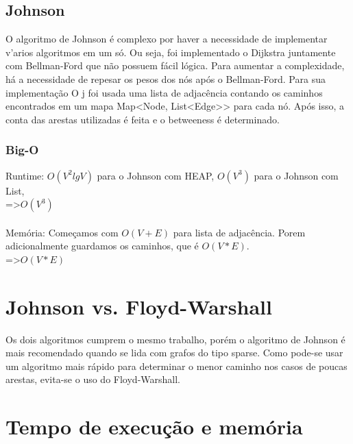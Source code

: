 \documentclass[a4paper,11pt,oneside]{article}
\begin{document}
    \subsection{Johnson}
    O algoritmo de Johnson \'e complexo por haver a necessidade de implementar v'arios algoritmos em um s\'o. Ou seja, foi implementado o Dijkstra juntamente com Bellman-Ford que n\~ao possuem f\'acil l\'ogica. Para aumentar a complexidade, h\'a a necessidade de repesar os pesos dos n\'os ap\'os o Bellman-Ford. Para sua implementa\c{c}\~ao O j foi usada uma lista de adjac\^encia contando os caminhos encontrados em um mapa Map{\textless}Node, List{\textless}Edge{\textgreater}{\textgreater} para cada n\'o. Ap\'os isso, a conta das arestas utilizadas \'e feita e o betweeness \'e determinado.
    \subsubsection{Big-O}
    Runtime: \begin{math} O(V^2 lg V) \end{math} para o Johnson com HEAP, \begin{math} O(V^3) \end{math} para o Johnson com List,  \\
    =\textgreater \begin{math}O(V^3)\end{math} \\\\
    Mem\'oria: Come\c{c}amos com \begin{math}O(V+E)\end{math} para lista de adjac\^encia. Porem adicionalmente guardamos os caminhos, que \'e \begin{math}O(V * E)\end{math}. \\
    =\textgreater \begin{math}O(V * E)\end{math}
    
    \section{Johnson vs. Floyd-Warshall}
    Os dois algoritmos cumprem o mesmo trabalho, por\'em o algoritmo de Johnson \'e mais recomendado quando se lida com grafos do tipo sparse. Como pode-se usar um algoritmo mais r\'apido para determinar o menor caminho nos casos de poucas arestas, evita-se o uso do Floyd-Warshall.
    
    \section{Tempo de execu\c{c}\~ao e mem\'oria}
\end{document}
